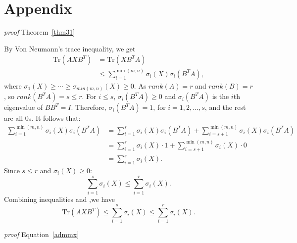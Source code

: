 \documentclass{article}
\begin{document}
{{\small{}

}{\small\par}




\appendix


\section{Appendix}
\textit{proof} Theorem~\ref{thm31}

By Von Neumann’s trace inequality, we get
\begin{equation}
	\begin{aligned}
		\text{Tr}(AXB^T) & = \text{Tr}(XB^TA) \\
		& \leq  \sum_{i=1}^{\min(m,n)} \sigma_i(X) \sigma_i(B^TA),
	\end{aligned}
\end{equation}
where $\sigma_1(X) \geq \cdots \geq \sigma_{min(m,n)}(X) \geq 0 $. As $rank(A) = r$ and $rank(B) =r$, so $rank(B^TA) =s \leq r$. For $i \leq s$, $\sigma_i(B^TA) \geq 0$ and $\sigma_i(B^TA)$ is the $i$th eigenvalue of $BB^T=I$. Therefore, $\sigma_i(B^TA) = 1$, for $i=1,2,\dots,s$, and the rest are all 0s. It follows that:
\begin{equation}
	\begin{aligned}
		\sum_{i=1}^{\min(m,n)} \sigma_i(X) \sigma_i(B^TA) & = \sum_{i=1}^{s} \sigma_i(X) \sigma_i(B^TA) + \sum_{i=s+1}^{\min(m,n)} \sigma_i(X) \sigma_i(B^TA) \\
		& = \sum_{i=1}^{s} \sigma_i(X) \cdot 1 + \sum_{i=s+1}^{\min(m,n)} \sigma_i(X) \cdot 0 \\
		& = \sum_{i=1}^{s} \sigma_i(X).
	\end{aligned}
\end{equation}
Since $s \leq r$ and $\sigma_i(X) \geq 0$:
\begin{equation*}
	\sum_{i=1}^s \sigma_i(X)\leq \sum_{i=1}^r \sigma_i(X).
\end{equation*}
Combining inequalities and ,we have 
\begin{equation}
	\text{Tr}(AXB^T) \leq \sum_{i=1}^s \sigma_i(X)\leq \sum_{i=1}^r \sigma_i(X).
\end{equation}


\textit{proof} Equation~\ref{admmx}

}
\end{document}
